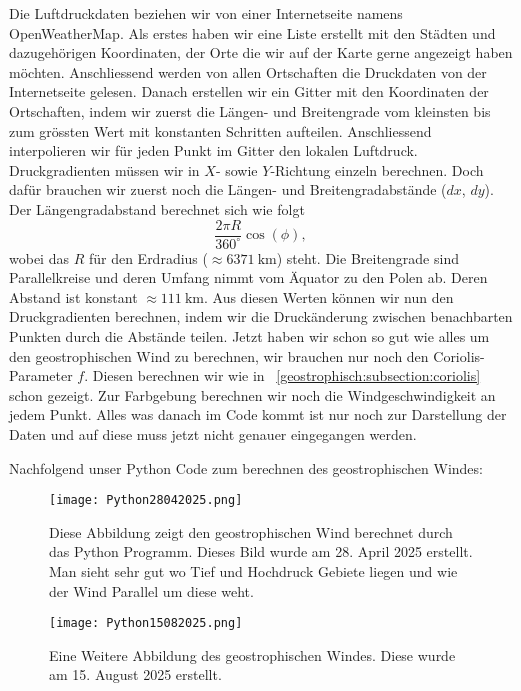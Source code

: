Die Luftdruckdaten beziehen wir von einer Internetseite namens OpenWeatherMap.
Als erstes haben wir eine Liste erstellt mit den Städten und dazugehörigen Koordinaten, der Orte die wir auf der Karte gerne angezeigt haben möchten.
Anschliessend werden von allen Ortschaften die Druckdaten von der Internetseite gelesen.
Danach erstellen wir ein Gitter mit den Koordinaten der Ortschaften, indem wir zuerst die Längen- und Breitengrade vom kleinsten bis zum grössten Wert mit konstanten Schritten aufteilen.
Anschliessend interpolieren wir für jeden Punkt im Gitter den lokalen Luftdruck.
Druckgradienten müssen wir in \(X\)- sowie \(Y\)-Richtung einzeln berechnen.
Doch dafür brauchen wir zuerst noch die Längen- und Breitengradabstände ($dx$, $dy$).
Der Längengradabstand berechnet sich wie folgt
\begin{equation}
	\frac{2 \pi R}{360^\circ} \cos(\phi), 
\end{equation}
wobei das $R$ für den Erdradius ($\approx\SI{6371}{\kilo\meter}$) steht. 
Die Breitengrade sind Parallelkreise und deren Umfang nimmt vom Äquator zu den Polen ab.
Deren Abstand ist konstant $\approx\SI{111}{\kilo\meter}$.
Aus diesen Werten können wir nun den Druckgradienten berechnen, indem wir die Druckänderung zwischen benachbarten Punkten durch die Abstände teilen.
Jetzt haben wir schon so gut wie alles um den geostrophischen Wind zu berechnen, wir brauchen nur noch den Coriolis-Parameter $f$.
Diesen berechnen wir wie in ~\ref{geostrophisch:subsection:coriolis} schon gezeigt. 
Zur Farbgebung berechnen wir noch die Windgeschwindigkeit an jedem Punkt. 
Alles was danach im Code kommt ist nur noch zur Darstellung der Daten und auf diese muss jetzt nicht genauer eingegangen werden.

Nachfolgend unser Python Code zum berechnen des geostrophischen Windes: 


\begin{figure}
	\centering
	\texttt{[image: Python28042025.png]}
	\caption{Diese Abbildung zeigt den geostrophischen Wind berechnet durch das Python Programm.
	Dieses Bild wurde am 28. April 2025 erstellt.
	Man sieht sehr gut wo Tief und Hochdruck Gebiete liegen und wie der Wind Parallel um diese weht.}
	\label{bild:28042025}
\end{figure}

\begin{figure}
	\centering
	\texttt{[image: Python15082025.png]}
	\caption{Eine Weitere Abbildung des geostrophischen Windes.
	Diese wurde am 15. August 2025 erstellt.
	}
	\label{bild:15082025}
\end{figure}


